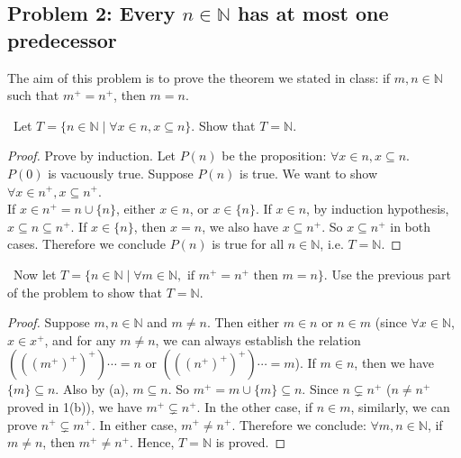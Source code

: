 \documentclass[12pt,a4paper]{amsart}
\newcommand{\suc}[1]{#1^+}
\newcommand{\bbN}{\mathbb{N}}
\newcommand{\turnin}{\faPencilSquareO}
\newcommand{\set}[1]{\{#1\}}
\begin{document}
\vspace{1em}
\subsection*{Problem 2: Every $n \in \bbN$ has at most one predecessor}
The aim of this problem is to prove the theorem we stated in class: if $m, n \in \bbN$ such that $\suc{m} = \suc{n}$, then $m = n$.
\begin{compactenum}[(a)]
  \setlength{\itemsep}{0.5em}
\item \turnin\
  Let $T = \{n \in \bbN \mid \forall x \in n, x \subseteq n\}$.
  Show that $T = \bbN$.

\begin{proof}
Prove by induction.
Let $P(n)$ be the proposition: $\forall x \in n, x \subseteq n$.\\
$P(0)$ is vacuously true. Suppose $P(n)$ is true. We want to show $\forall x \in \suc{n}, x \subseteq \suc{n}$.\\
If $x \in \suc{n} = n \cup \set{n}$, either $x \in n$, or $x \in \set{n}$.
If $x \in n$, by induction hypothesis, $x \subseteq n \subseteq \suc{n}$.
If $x \in \set{n}$, then $x=n$, we also have $x \subseteq \suc{n}$.
So $x \subseteq \suc{n}$ in both cases.
Therefore we conclude $P(n)$ is true for all $n \in \bbN$, i.e. $T=\bbN$.
\end{proof}

\item \turnin\ Now let $T = \{n \in \bbN \mid \forall m\in \bbN, \text{ if } \suc{m} = \suc{n} \text{ then } m = n\}$.
  Use the previous part of the problem to show that $T = \bbN$.

\begin{proof}
Suppose $m,n \in \bbN$ and $m \neq n$. Then either $m \in n$ or $n \in m$
(since $\forall x \in \bbN$, $x \in \suc{x}$, and for any $m \neq n$, we can always establish the relation
$(\suc{(\suc{(\suc{m})})})\cdots = n$ or $(\suc{(\suc{(\suc{n})})})\cdots = m$).
If $m \in n$, then we have $\set{m} \subseteq n$. Also by (a), $m \subseteq n$. So $\suc{m} = m \cup \set{m} \subseteq n$.
Since $n \subsetneq \suc{n}$ ($n \neq \suc{n}$ proved in 1(b)), we have $\suc{m} \subsetneq \suc{n}$.
In the other case, if $n \in m$, similarly, we can prove $\suc{n} \subsetneq \suc{m}$. In either case, $\suc{m} \neq \suc{n}$.
Therefore we conclude: $\forall m,n \in \bbN$, if $m \neq n$, then $\suc{m} \neq \suc{n}$. Hence, $T = \bbN$ is proved.
\end{proof}

\end{compactenum}
\end{document}
